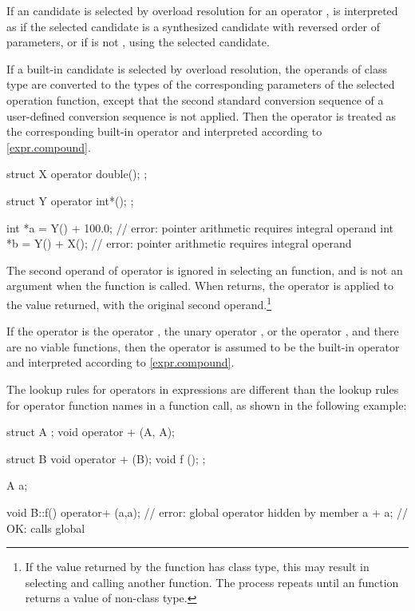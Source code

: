 \pnum
If an  candidate
is selected by overload resolution for an operator ,
is interpreted as 
if the selected candidate is a synthesized candidate
with reversed order of parameters,
or  if  is not \tcode{<=>},
using the selected  candidate.

\pnum
If a built-in candidate is selected by overload resolution, the
operands of class type are converted to the types of the corresponding parameters
of the selected operation function, except that the second standard conversion
sequence of a user-defined conversion sequence is not applied.
Then the operator is treated as the corresponding
built-in operator and interpreted according to \ref{expr.compound}.
\begin{example}
\begin{codeblock}
struct X {
  operator double();
};

struct Y {
  operator int*();
};

int *a = Y() + 100.0;           // error: pointer arithmetic requires integral operand
int *b = Y() + X();             // error: pointer arithmetic requires integral operand
\end{codeblock}
\end{example}

\pnum
The second operand of operator
\tcode{->}
is ignored in selecting an
function, and is not an argument when the
function is called.
When
returns, the operator
\tcode{->}
is applied to the value returned, with the original second
operand.\footnote{If the value returned by the
function has class type, this may result in selecting and calling another
function.
The process repeats until an
function returns a value of non-class type.}

\pnum
If the operator is the operator
\tcode{,},
the unary operator
\tcode{\&},
or the operator
\tcode{->},
and there are no viable functions, then the operator is
assumed to be the built-in operator and interpreted according to
\ref{expr.compound}.

\pnum
\begin{note}
The lookup rules for operators in expressions are different than
the lookup
rules for operator function names in a function call, as shown in the following
example:

\begin{codeblock}
struct A { };
void operator + (A, A);

struct B {
  void operator + (B);
  void f ();
};

A a;

void B::f() {
  operator+ (a,a);              // error: global operator hidden by member
  a + a;                        // OK: calls global 
}
\end{codeblock}
\end{note}

